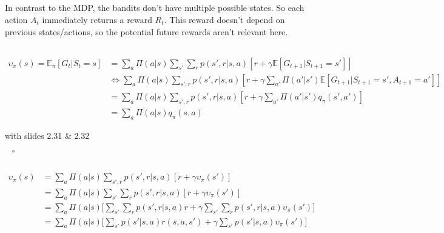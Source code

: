 \documentclass[11pt,a4paper]{article}
\begin{document}
\subsection{}
In contrast to the MDP, the bandits don't have multiple possible states. So each action $A_{t}$ immediately returns a reward $R_{t}$.
This reward doesn't depend on previous states/actions, so the potential future rewards aren't relevant here.


\subsection{}

\begin{align*}
    \upsilon_{\pi}(s)    = \mathbb{E}_{\pi}[G_{t}|S_{t}=s] 
                    & = \sum_{a}\Pi(a|s)\sum_{s'}\sum_{r}p(s',r|s,a)[r+\gamma\mathbb{E}[G_{t+1}|S_{t+1}=s']]\\
                    & \Leftrightarrow \sum_{a}\Pi(a|s)\sum_{s',r}p(s',r|s,a)[r+\gamma\sum_{a'}\Pi(a'|s')\mathbb{E}[G_{t+1}|S_{t+1}=s', A_{t+1}=a']]\\
                    & = \sum_{a}\Pi(a|s)\sum_{s',r}p(s',r|s,a)[r+\gamma\sum_{a'}\Pi(a'|s')q_{\pi}(s',a')]\\
                    & = \sum_{a}\Pi(a|s)q_{\pi}(s,a)
\end{align*}

\begin{flushright}
    \begin{footnotesize}
        with slides 2.31 \& 2.32 
    \end{footnotesize}
    $\;\;\;\square$
\end{flushright}

\subsection{} 

\begin{align*}
    \upsilon_{\pi}(s) & = \sum_{a}\Pi(a|s)\sum_{s',r}p(s',r|s,a)[r+\gamma\upsilon_{\pi}(s')]\\
                      & = \sum_{a}\Pi(a|s)\sum_{s'}\sum_{r}p(s',r|s,a)[r+\gamma\upsilon_{\pi}(s')]\\
                      & = \sum_{a}\Pi(a|s)\bigg[\sum_{s'}\sum_{r}p(s',r|s,a)r+\gamma\sum_{s'}\sum_{r}p(s',r|s,a)\upsilon_{\pi}(s')\biggr]\\
                      & = \sum_{a}\Pi(a|s)\bigg[\sum_{s'}p(s'|s,a)r(s,a,s')+\gamma\sum_{s'}p(s'|s,a)\upsilon_{\pi}(s')\biggr]
\end{align*}
\end{document}
